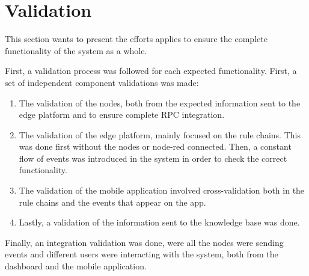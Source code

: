 \section{Validation}

This section wants to present the efforts applies to ensure the complete functionality of the system as a whole.

First, a validation process was followed for each expected functionality. First, a set of independent component validations was made:

\begin{enumerate}
    \item The validation of the nodes, both from the expected information sent to the edge platform and to ensure complete RPC integration.
    \item The validation of the edge platform, mainly focused on the rule chains. This was done first without the nodes or node-red connected. Then, a constant flow of events 
        was introduced in the system in order to check the correct functionality.
    \item The validation of the mobile application involved cross-validation both in the rule chains and the events that appear on the app.
    \item Lastly, a validation of the information sent to the knowledge base was done.
\end{enumerate}

Finally, an integration validation was done, were all the nodes were sending events and different users were interacting with the system, both from the dashboard and the mobile application.